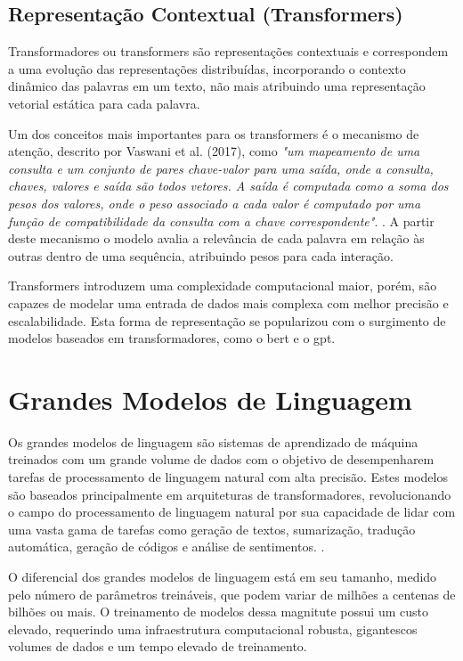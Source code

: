 \subsection{Representação Contextual (Transformers)}\label{subsec:transformers}

Transformadores ou transformers são representações contextuais e correspondem a uma evolução das representações distribuídas, incorporando o contexto dinâmico das palavras em um texto, não mais atribuindo uma representação vetorial estática para cada palavra. 

Um dos conceitos mais importantes para os transformers é o mecanismo de atenção, descrito por Vaswani et al. (2017), como \textit{"um mapeamento de uma consulta e um conjunto de pares chave-valor para uma saída, onde a consulta, chaves, valores e saída são todos vetores. A saída é computada como a soma dos pesos dos valores, onde o peso associado a cada valor é computado por uma função de compatibilidade da consulta com a chave correspondente"}. \cite{VaswaniTransformer2017}. A partir deste mecanismo o modelo avalia a relevância de cada palavra em relação às outras dentro de uma sequência, atribuindo pesos para cada interação.

Transformers introduzem uma complexidade computacional maior, porém, são capazes de modelar uma entrada de dados mais complexa com melhor precisão e escalabilidade. Esta forma de representação se popularizou com o surgimento de modelos baseados em transformadores, como o \gls{bert} e o \gls{gpt}.

\section{Grandes Modelos de Linguagem}\label{sec:llm}

Os grandes modelos de linguagem são sistemas de aprendizado de máquina treinados com um grande volume de dados com o objetivo de desempenharem tarefas de processamento de linguagem natural com alta precisão. Estes modelos são baseados principalmente em arquiteturas de transformadores, revolucionando o campo do processamento de linguagem natural por sua capacidade de lidar com uma vasta gama de tarefas como geração de textos, sumarização, tradução automática, geração de códigos e análise de sentimentos. \cite{IBMLLM}.

O diferencial dos grandes modelos de linguagem está em seu tamanho, medido pelo número de parâmetros treináveis, que podem variar de milhões a centenas de bilhões ou mais. O treinamento de modelos dessa magnitute possui um custo elevado, requerindo uma infraestrutura computacional robusta, gigantescos volumes de dados e um tempo elevado de treinamento. 

